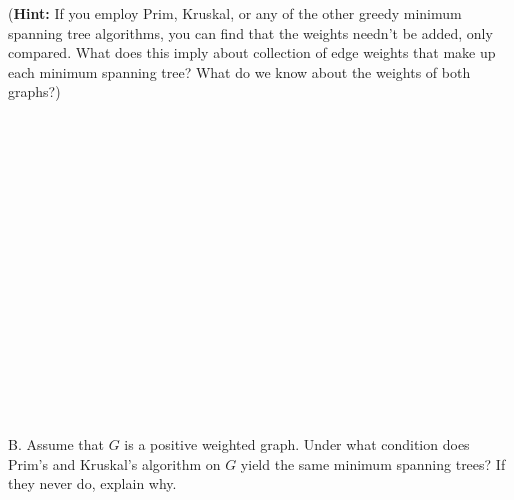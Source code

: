 \documentclass[12pt]{article}
\begin{document}
(\textbf{Hint: }If you employ Prim, Kruskal, or any of the other greedy minimum spanning tree algorithms, you can find that the weights needn't be added, only compared. 
What does this imply about collection of edge weights that make up each minimum spanning tree? What do we know about the weights of both graphs?)\\\\\\\\\\\\\\\\\\\\\\\\\\\\\\\\\\\\
\noindent B. Assume that $G$ is a positive weighted graph. 
Under what condition does Prim's and Kruskal's algorithm on $G$  
yield the same minimum spanning trees? If they never do, explain why.
\end{document}
